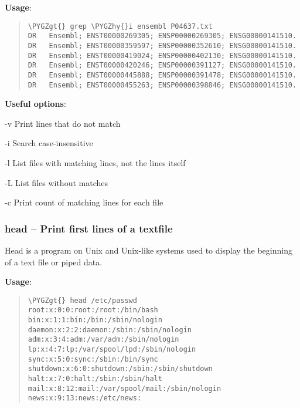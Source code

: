 \documentclass[a4paper,11pt,english]{sphinxmanual}
\def\PYGZgt{\char`\>}
\def\PYGZhy{\char`\-}
\begin{document}
\textbf{Usage}:  
\begin{quote}

\begin{Verbatim}[frame=single, rulecolor=\color{lightgray}, fontfamily=courier, commandchars=\\\{\}]
\PYGZgt{} grep \PYGZhy{}i ensembl P04637.txt
DR   Ensembl; ENST00000269305; ENSP00000269305; ENSG00000141510.
DR   Ensembl; ENST00000359597; ENSP00000352610; ENSG00000141510.
DR   Ensembl; ENST00000419024; ENSP00000402130; ENSG00000141510.
DR   Ensembl; ENST00000420246; ENSP00000391127; ENSG00000141510.
DR   Ensembl; ENST00000445888; ENSP00000391478; ENSG00000141510.
DR   Ensembl; ENST00000455263; ENSP00000398846; ENSG00000141510.
\end{Verbatim}
\end{quote}

\textbf{Useful options}:
\begin{optionlist}{3cm}
\item [-v]  
Print lines that do not match
\item [-i]  
Search case-insensitive
\item [-l]  
List files with matching lines, not the lines itself
\item [-L]  
List files without matches
\item [-c]  
Print count of matching lines for each file
\end{optionlist}


\subsubsection{head – Print first lines of a textfile}
\label{introduction:head-print-first-lines-of-a-textfile}
Head is a program on Unix and Unix-like systems used to display the beginning of a text file or piped data.

\textbf{Usage}:  
\begin{quote}

\begin{Verbatim}[frame=single, rulecolor=\color{lightgray}, fontfamily=courier, commandchars=\\\{\}]
\PYGZgt{} head /etc/passwd
root:x:0:0:root:/root:/bin/bash
bin:x:1:1:bin:/bin:/sbin/nologin
daemon:x:2:2:daemon:/sbin:/sbin/nologin
adm:x:3:4:adm:/var/adm:/sbin/nologin
lp:x:4:7:lp:/var/spool/lpd:/sbin/nologin
sync:x:5:0:sync:/sbin:/bin/sync
shutdown:x:6:0:shutdown:/sbin:/sbin/shutdown
halt:x:7:0:halt:/sbin:/sbin/halt
mail:x:8:12:mail:/var/spool/mail:/sbin/nologin
news:x:9:13:news:/etc/news:
\end{Verbatim}
\end{quote}
\end{document}
